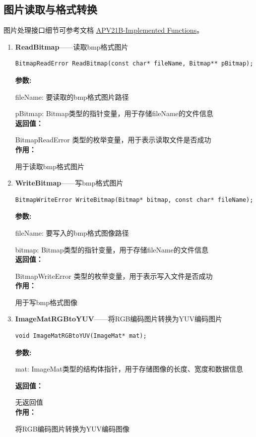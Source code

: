 \documentclass[12pt, a4paper, oneside]{ctexbook}
\begin{document}
	
		\subsection{图片读取与格式转换}
		图片处理接口细节可参考文档 \href{./ref/APV21B_Implemented_Functions.pdf}{APV21B-Implemented Functions}。
		\begin{enumerate}
			\item \textbf{ReadBitmap}——读取bmp格式图片
				\begin{lstlisting}[numbers=none]
BitmapReadError ReadBitmap(const char* fileName, Bitmap** pBitmap);
				\end{lstlisting}
				\textbf{参数:} \par fileName: 要读取的bmp格式图片路径 \par pBitmap: Bitmap类型的指针变量，用于存储fileName的文件信息 \\
				\textbf{返回值：}\par BitmapReadError 类型的枚举变量，用于表示读取文件是否成功\\
				\textbf{作用：}\par 用于读取bmp格式图片\\
			
			\item \textbf{WriteBitmap}——写bmp格式图片
				\begin{lstlisting}[numbers=none]
BitmapWriteError WriteBitmap(Bitmap* bitmap, const char* fileName);
				\end{lstlisting}
				\textbf{参数:} \par fileName: 要写入的bmp格式图像路径 \par bitmap: Bitmap类型的指针变量，用于存储fileName的文件信息 \\
				\textbf{返回值：}\par BitmapWriteError 类型的枚举变量，用于表示写入文件是否成功\\
				\textbf{作用：}\par 用于写bmp格式图像\\
			
			\item \textbf{ImageMatRGBtoYUV}——将RGB编码图片转换为YUV编码图片
				\begin{lstlisting}[numbers=none]
void ImageMatRGBtoYUV(ImageMat* mat);
				\end{lstlisting}
				\textbf{参数:} \par mat: ImageMat类型的结构体指针，用于存储图像的长度、宽度和数据信息\par 
				\textbf{返回值：}\par 无返回值 \\
				\textbf{作用：}\par  将RGB编码图片转换为YUV编码图像\\


\end{enumerate}
\end{document}
